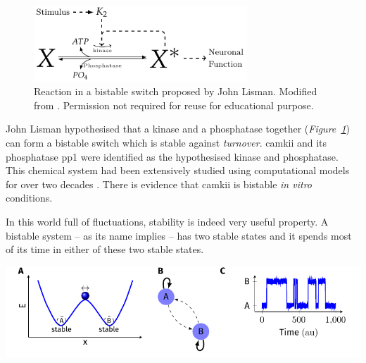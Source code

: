 \documentclass[]{resonance}
\newcommand\Fig[1]{\textit{Figure~\ref{#1}}}
\begin{document}
\begin{figure}[ht!]
    \centering
    \includegraphics[width=8cm]{./lisman_bistable.pdf}
    \caption{Reaction in a bistable switch proposed by John Lisman. Modified
        from \cite{lisman1985}. Permission not required for reuse for
        educational purpose.
    }\label{fig:lisman}
\end{figure}

John Lisman hypothesised that a kinase and a phosphatase together
(\Fig{fig:lisman}) can form a bistable switch which is stable against
\emph{turnover}. \gls{camkii} and its phosphatase \gls{pp1} were identified as
the hypothesised kinase and phosphatase. This chemical system had been
extensively studied using computational models for over two decades
\cite{sandstorm}. There is evidence that \gls{camkii} is bistable \emph{in
vitro} conditions. 

 {
    In this world full of fluctuations, stability is indeed very useful
    property. A bistable system -- as its name implies -- has two stable 
    states and it spends most of its time in either of these two stable states.

    \includegraphics[width=\linewidth]{./stability_noise.pdf}
}
\end{document}
